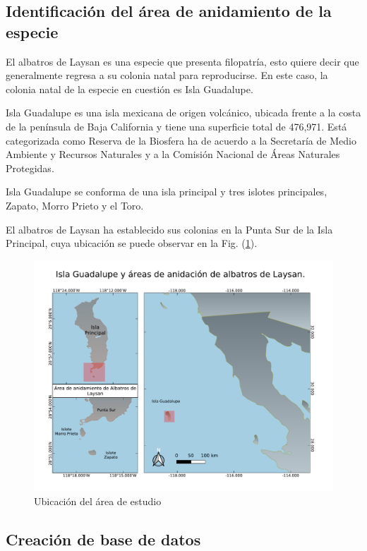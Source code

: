 \clearpage
\subsection{Identificación del área de anidamiento de la especie}

El albatros de Laysan es una especie que presenta filopatría, esto quiere decir
que generalmente regresa a su colonia natal para reproducirse. En este caso, la
colonia natal de la especie en cuestión es Isla Guadalupe.

Isla Guadalupe es una isla mexicana de origen volcánico, ubicada frente a la
costa de la península de Baja California y tiene una superficie total de
476,971. Está categorizada como Reserva de la Biosfera ha de acuerdo a la
Secretaría de Medio Ambiente y Recursos Naturales y a la Comisión Nacional de
Áreas Naturales Protegidas.

Isla Guadalupe se conforma de una isla principal y tres islotes principales,
Zapato, Morro Prieto y el Toro.

El albatros de Laysan ha establecido sus colonias en la Punta Sur de la Isla
Principal, cuya ubicación se puede observar en la Fig.
(\ref{fig:ubicacionIslaGpe}).

\begin{figure}[h]
    \centering
    \includegraphics[scale=0.60]{figures/Isla Guadalupe.pdf}
    \caption{Ubicación del área de estudio}
    \label{fig:ubicacionIslaGpe}
\end{figure}

\clearpage
\subsection{Creación de base de datos}

